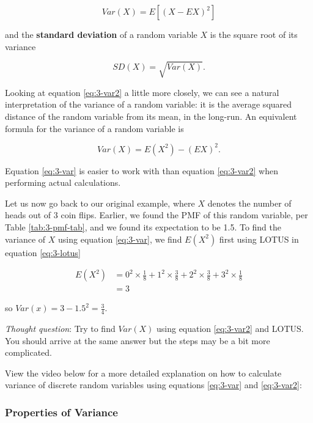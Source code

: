 \documentclass[
]{book}
\begin{document}
\begin{equation} 
Var(X) = E[(X - EX)^2]
\label{eq:3-var2}
\end{equation}

and the \textbf{standard deviation} of a random variable \(X\) is the square root of its variance

\begin{equation} 
SD(X) = \sqrt{Var(X)}.
\label{eq:3-sd}
\end{equation}

Looking at equation \eqref{eq:3-var2} a little more closely, we can see a natural interpretation of the variance of a random variable: it is the average squared distance of the random variable from its mean, in the long-run. An equivalent formula for the variance of a random variable is

\begin{equation} 
Var(X) = E(X^2) - (EX)^2.
\label{eq:3-var}
\end{equation}

Equation \eqref{eq:3-var} is easier to work with than equation \eqref{eq:3-var2} when performing actual calculations.

Let us now go back to our original example, where \(X\) denotes the number of heads out of 3 coin flips. Earlier, we found the PMF of this random variable, per Table \ref{tab:3-pmf-tab}, and we found its expectation to be 1.5. To find the variance of \(X\) using equation \eqref{eq:3-var}, we find \(E(X^2)\) first using LOTUS in equation \eqref{eq:3-lotus}

\[
\begin{split}
E(X^2) &= 0^2 \times \frac{1}{8} + 1^2 \times \frac{3}{8} + 2^2 \times \frac{3}{8} + 3^2 \times \frac{1}{8} \\
       &= 3
\end{split}
\]

so \(Var(x) = 3 - 1.5^2 = \frac{3}{4}\).

\emph{Thought question}: Try to find \(Var(X)\) using equation \eqref{eq:3-var2} and LOTUS. You should arrive at the same answer but the steps may be a bit more complicated.

View the video below for a more detailed explanation on how to calculate variance of discrete random variables using equations \eqref{eq:3-var} and \eqref{eq:3-var2}:

\hypertarget{var-prop}{%
\subsubsection{Properties of Variance}\label{var-prop}}
\end{document}
